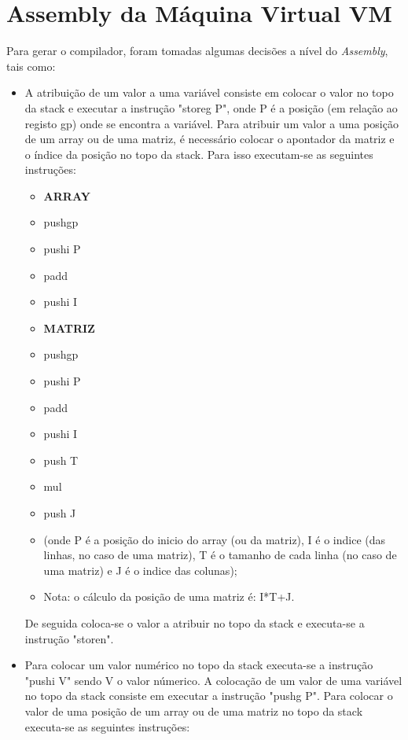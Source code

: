 \documentclass{report}
\begin{document}
\section{Assembly da Máquina Virtual VM}
Para gerar o compilador, foram tomadas algumas decisões a nível do \textit{Assembly}, tais como: 
\begin{itemize}
\item A atribuição de um valor a uma variável consiste em colocar o valor no topo da stack e executar a instrução "storeg P", onde P é a posição (em relação ao registo gp) onde se encontra a variável. Para atribuir um valor a uma posição de um array ou de uma matriz, é necessário colocar o apontador da matriz e o índice da posição no topo da stack. Para isso executam-se as seguintes instruções:
\begin{multicols}{2}
\begin{itemize}
\item \textbf{ARRAY}
\item pushgp
\item pushi P
\item padd
\item pushi I
\end{itemize}
\columnbreak
\begin{itemize}
\item \textbf{MATRIZ}
\item pushgp
\item pushi P
\item padd
\item pushi I
\item push T
\item mul
\item push J
\item (onde P é a posição do inicio do array (ou da matriz), I é o indice (das linhas, no caso de uma matriz), T é o tamanho de cada linha (no caso de uma matriz) e J é o indice das colunas);
\item Nota: o cálculo da posição de uma matriz é: I*T+J.
\end{itemize}
\end{multicols}
De seguida coloca-se o valor a atribuir no topo da stack e executa-se a instrução "storen".
\item Para colocar um valor numérico no topo da stack executa-se a instrução "pushi V" sendo V o valor númerico. A colocação de um valor de uma variável no topo da stack consiste em executar a instrução "pushg P". Para colocar o valor de uma posição de um array ou de uma matriz no topo da stack executa-se as seguintes instruções:

\end{itemize}
\end{document}
